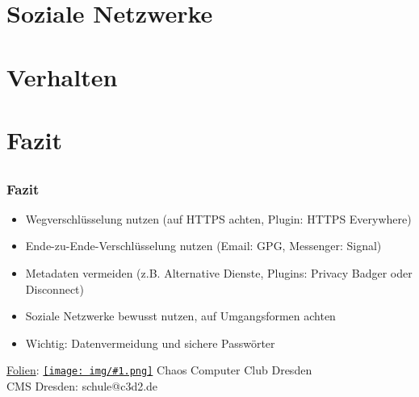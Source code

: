 \documentclass[12pt, xcolor={svgnames,table}]{beamer}
\newcommand{\cc}[1]{\texttt{[image: img/\#1.png]}\hspace{1mm}}
\begin{document}
\subsection{}


\section{Soziale Netzwerke}
\subsection{}


\section{Verhalten}
\subsection{}


\section{Fazit}
\subsection{}

\begin{frame}
  \frametitle{Fazit}
  \begin{center}
    \begin{itemize}
      \item Wegverschlüsselung nutzen (auf HTTPS achten, Plugin: HTTPS Everywhere)
      \item Ende-zu-Ende-Verschlüsselung nutzen (Email: GPG, Messenger: Signal)
      \item Metadaten vermeiden (z.B. Alternative Dienste, Plugins: Privacy Badger oder Disconnect)
      \item Soziale Netzwerke bewusst nutzen, auf Umgangsformen achten
      \item Wichtig: Datenvermeidung und sichere Passwörter
    \end{itemize}

    \vspace{5mm}
    \href{https://github.com/cms/2016_05_04_kleinzschachwitz/}{Folien}: \href{https://creativecommons.org/licenses/by-sa/4.0/}{\cc{by-sa}} Chaos Computer Club Dresden \\
    \vspace{3mm}
    CMS Dresden: schule@c3d2.de
  \end{center}
\end{frame}
\end{document}
